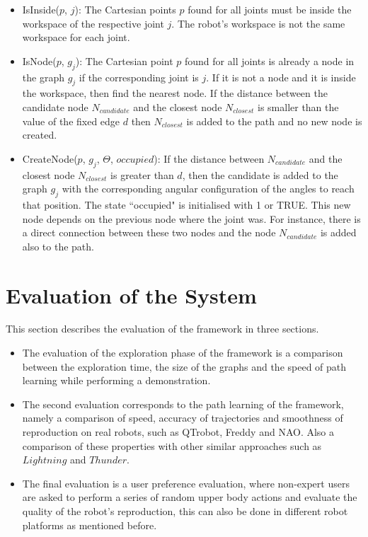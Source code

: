 \documentclass[thesis]{mas_proposal}
\begin{document}
\begin{itemize}
		 \begin{itemize}
		 	
		 	\item IsInside($p$, $j$): The Cartesian points $p$ found for all joints must be inside the workspace of the respective joint $j$. The robot's workspace is not the same workspace for each joint.
		 	\item IsNode($p$, $g_j$): The Cartesian point $p$ found for all joints is already a node in the graph $g_j$ if the corresponding joint is $j$. If it is not a node and it is inside the workspace, then find the nearest node. If the distance between the candidate node $N_{candidate}$ and the closest node $N_{closest}$ is smaller than the value of the fixed edge $d$ then $N_{closest}$ is added to the path and no new node is created.
		 	\item CreateNode($p$, $g_j$, $\Theta$, $occupied$): If the distance between $N_{candidate}$ and the closest node $N_{closest}$ is greater than $d$, then the candidate is added to the graph $g_j$ with the corresponding angular configuration of the angles to reach that position. The state ``occupied" is initialised with 1 or TRUE. This new node depends on the previous node where the joint was. For instance, there is a direct connection between these two nodes and the node $N_{candidate}$ is added also to the path.
		 	
		 \end{itemize} 
	\end{itemize} 

\section{Evaluation of the System}

	This section describes the evaluation of the framework in three sections. 
	
	\begin{itemize}
		
		\item The evaluation of the exploration phase of the framework is a comparison between the exploration time, the size of the graphs and the speed of path learning while performing a demonstration.
		
		\item The second evaluation corresponds to the path learning of the framework, namely a comparison of speed, accuracy of trajectories and smoothness of reproduction on real robots, such as QTrobot, Freddy and NAO.
		Also a comparison of these properties with other similar approaches such as $Lightning$ and $Thunder$. 
		
		\item The final evaluation is a user preference evaluation, where non-expert users are asked to perform a series of random upper body actions and evaluate the quality of the robot's reproduction, this can also be done in different robot platforms as mentioned before.
	
	\end{itemize}
\end{document}
